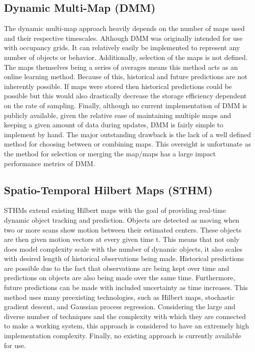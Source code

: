   \subsection { Dynamic Multi-Map (DMM) }
  The dynamic multi-map approach heavily depends on the number of maps used and their
  respective timescales. Although DMM was originally intended for use with
  occupancy grids. It can relatively easily be implemented to represent any
  number of objects or behavior. Additionally, selection of the maps is not
  defined. The maps themselves being a series of averages means this method acts as
  an online learning method. Because of this, historical and future predictions
  are not inherently possible. If maps were stored then historical predictions
  could be possible but this would also drastically decrease the storage
  efficiency dependent on the rate of sampling. Finally, although no current
  implementation of DMM is publicly available, given the relative ease of
  maintaining multiple maps and keeping a given amount of data during updates,
  DMM is fairly simple to implement by hand. The major outstanding drawback
  is the lack of a well defined method for choosing between or combining maps.
  This oversight is unfortunate as the method for selection or merging the
  map/maps has a large impact performance metrics of DMM.

  \subsection{ Spatio-Temporal Hilbert Maps (STHM) }
  STHMs extend existing Hilbert maps with the goal of providing real-time
  dynamic object tracking and prediction. Objects are detected as moving when
  two or more scans show motion between their estimated centers. These objects
  are then given motion vectors at every given time t. This means that not
  only does model complexity scale with the number of dynamic objects, it also
  scales with desired length of historical observations being made.
  Historical predictions are possible due to the
  fact that observations are being kept over time and predictions on objects
  are also being made over the same time.
  Furthermore, future predictions can be made with included uncertainty as
  time increases. This method uses many preexisting technologies, such
  as Hilbert maps, stochastic gradient descent, and Gaussian process regression.
  Considering the large and diverse number of techniques and the complexity with
  which they are connected to make a working system, this approach is considered
  to have an extremely high implementation complexity. Finally, no existing
  approach is currently available for use.

